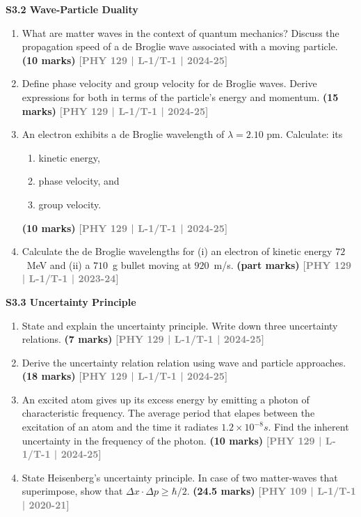 \documentclass[12pt,a3paper]{article}
\newcommand{\yr}[1]{\hfill\textcolor{gray}{\small\textbf{[#1]}}}
\newcommand{\mk}[1]{\textcolor{orange!70!black}{\small\textbf{(#1 marks)}}}
\newcommand{\subtopic}[2]{%
  \vspace{10pt}
  \noindent\begin{tcolorbox}[colback=#1!8,colframe=#1,boxrule=0.6pt,arc=4pt,
    left=6pt,right=6pt,top=4pt,bottom=4pt]
    \small\bfseries\textcolor{#1}{#2}
  \end{tcolorbox}
  \vspace{2pt}
}
\begin{document}
\label{sec:s32}
\subtopic{cA}{S3.2 \quad Wave-Particle Duality}

\begin{enumerate}

\item What are matter waves in the context of quantum mechanics? Discuss the propagation speed of a de Broglie wave associated with a moving particle.
\mk{10} \yr{PHY 129 | L-1/T-1 | 2024-25}

\item Define phase velocity and group velocity for de Broglie waves. Derive expressions for both in terms of the particle's energy and momentum.
\mk{15} \yr{PHY 129 | L-1/T-1 | 2024-25}

\item An electron exhibits a de Broglie wavelength of $\lambda = 2.10\text{ pm}$. Calculate: its
\begin{enumerate}
        \item[(i)] kinetic energy,
        \item[(ii)] phase velocity, and
        \item[(iii)] group velocity.
\end{enumerate}  
\mk{10} \yr{PHY 129 | L-1/T-1 | 2024-25}

\item Calculate the de Broglie wavelengths for (i) an electron of kinetic energy $72$~MeV and (ii) a $710$~g bullet moving at $920$~m/s.
\mk{part} \yr{PHY 129 | L-1/T-1 | 2023-24}

\end{enumerate}

\label{sec:s33}
\subtopic{cA}{S3.3 \quad Uncertainty Principle}

\begin{enumerate}

\item State and explain the uncertainty principle. Write down three uncertainty relations.
\mk{7} \yr{PHY 129 | L-1/T-1 | 2024-25}

\item Derive the uncertainty relation relation using wave and particle approaches.
\mk{18} \yr{PHY 129 | L-1/T-1 | 2024-25}

\item An excited atom gives up its excess energy by emitting a photon of characteristic frequency. The average period that elapes between the  excitation of an atom and the time it radiates $1.2\times 10^{-8}s$. Find the inherent uncertainty in the frequency of the photon.
\mk{10} \yr{PHY 129 | L-1/T-1 | 2024-25}


\item State Heisenberg's uncertainty principle. In case of two matter-waves that superimpose, show that $\Delta x \cdot \Delta p \geq \hbar/2$.
\mk{24.5} \yr{PHY 109 | L-1/T-1 | 2020-21}

\end{enumerate}
\end{document}
